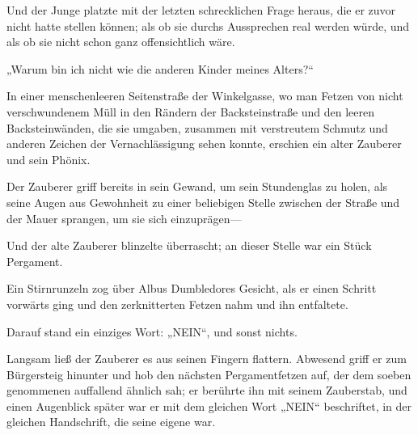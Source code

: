 Und der Junge platzte mit der letzten schrecklichen Frage heraus, die er zuvor nicht hatte stellen können; als ob sie durchs Aussprechen real werden würde, und als ob sie nicht schon ganz offensichtlich wäre.

„Warum bin ich nicht wie die anderen Kinder meines Alters?“

\later

In einer menschenleeren Seitenstraße der Winkelgasse, wo man Fetzen von nicht verschwundenem Müll in den Rändern der Backsteinstraße und den leeren Backsteinwänden, die sie umgaben, zusammen mit verstreutem Schmutz und anderen Zeichen der Vernachlässigung sehen konnte, erschien ein alter Zauberer und sein Phönix.

Der Zauberer griff bereits in sein Gewand, um sein Stundenglas zu holen, als seine Augen aus Gewohnheit zu einer beliebigen Stelle zwischen der Straße und der Mauer sprangen, um sie sich einzuprägen—

Und der alte Zauberer blinzelte überrascht; an dieser Stelle war ein Stück Pergament.

Ein Stirnrunzeln zog über Albus Dumbledores Gesicht, als er einen Schritt vorwärts ging und den zerknitterten Fetzen nahm und ihn entfaltete.

Darauf stand ein einziges Wort: „NEIN“, und sonst nichts.

Langsam ließ der Zauberer es aus seinen Fingern flattern. Abwesend griff er zum Bürgersteig hinunter und hob den nächsten Pergamentfetzen auf, der dem soeben genommenen auffallend ähnlich sah; er berührte ihn mit seinem Zauberstab, und einen Augenblick später war er mit dem gleichen Wort „NEIN“ beschriftet, in der gleichen Handschrift, die seine eigene war.

